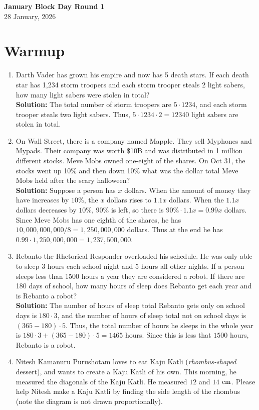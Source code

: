\documentclass[a4paper]{article}
\begin{document}
\begin{center}
{\Large\bfseries January Block Day Round 1}\\[0.25cm]
{\large 28 January, 2026}\\[1cm]
\end{center}

\section*{Warmup}
\begin{enumerate}[itemsep=2cm]
    \item Darth Vader has grown his empire and now has 5 death stars. If each death star has 1,234 storm troopers and each storm trooper steals 2 light sabers, how many light sabers were stolen in total? \\
    \textbf{Solution: } The total number of storm troopers are $5\cdot1234$, and each storm trooper steals two light sabers. Thus, $5\cdot1234\cdot2=\boxed{12340}$ light sabers are stolen in total. \\
    \item On Wall Street, there is a company named Mapple. They sell Myphones and Mypads. Their company was worth \$10B and was distributed in 1 million different stocks. Meve Mobs owned one-eight of the shares. On Oct 31, the stocks went up 10\% and then down 10\% what was the dollar total Meve Mobs held after the scary halloween? \\
    \textbf{Solution: } Suppose a person has $x$ dollars. When the amount of money they have increases by $10\%$, the $x$ dollars rises to $1.1x$ dollars. When the $1.1x$ dollars decreases by $10\%$, $90\%$ is left, so there is $90\%\cdot1.1x=0.99x$ dollars. Since Meve Mobs has one eighth of the shares, he has $10,000,000,000/8=1,250,000,000$ dollars. Thus at the end he has $0.99\cdot 1,250,000,000=\boxed{1,237,500,000}$.
    \item Rebanto the Rhetorical Responder overloaded his schedule. He was only able to sleep 3 hours each school night and 5 hours all other nights. If a person sleeps less than 1500 hours a year they are considered a robot. If there are 180 days of school, how many hours of sleep does Rebanto get each year and is Rebanto a robot?  \\
    \textbf{Solution: } The number of hours of sleep total Rebanto gets only on school days is $180\cdot3$, and the number of hours of sleep total not on school days is $(365-180)\cdot5$. Thus, the total number of hours he sleeps in the whole year is $180\cdot3+(365-180)\cdot5=\boxed{1465}$ hours. Since this is less that $1500$ hours, Rebanto is a robot.
    \item Nitesh Kamanuru Purushotam loves to eat Kaju Katli (\textit{rhombus-shaped} dessert), and wants to create a Kaju Katli of his own. This morning, he measured the diagonals of the Kaju Katli. He measured $12$ and $14$ $\rm cm$. Please help Nitesh make a Kaju Katli by finding the side length of the rhombus (note the diagram is not drawn proportionally).
    

\end{enumerate}
\end{document}
